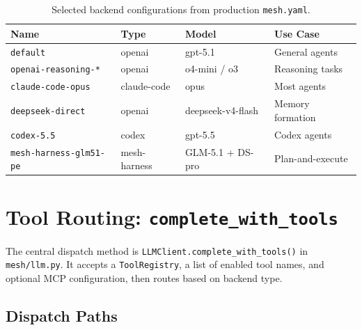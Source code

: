 \documentclass[11pt,a4paper]{article}
\newcommand{\code}[1]{\texttt{#1}}
\begin{document}
\begin{table}[h]
\centering
\small
\begin{tabular}{@{}llll@{}}
\toprule
\textbf{Name} & \textbf{Type} & \textbf{Model} & \textbf{Use Case} \\
\midrule
\code{default}              & openai     & gpt-5.1              & General agents \\
\code{openai-reasoning-*}   & openai     & o4-mini / o3         & Reasoning tasks \\
\code{claude-code-opus}     & claude-code & opus                & Most agents \\
\code{deepseek-direct}      & openai     & deepseek-v4-flash    & Memory formation \\
\code{codex-5.5}            & codex      & gpt-5.5              & Codex agents \\
\code{mesh-harness-glm51-pe}& mesh-harness & GLM-5.1 + DS-pro  & Plan-and-execute \\
\bottomrule
\end{tabular}
\caption{Selected backend configurations from production \code{mesh.yaml}.}
\end{table}

\section{Tool Routing: \code{complete\_with\_tools}}
\label{sec:tool-routing}

The central dispatch method is \code{LLMClient.complete\_with\_tools()}
in \code{mesh/llm.py}. It accepts a \code{ToolRegistry}, a list of
enabled tool names, and optional MCP configuration, then routes based on
backend type.

\subsection{Dispatch Paths}
\end{document}
